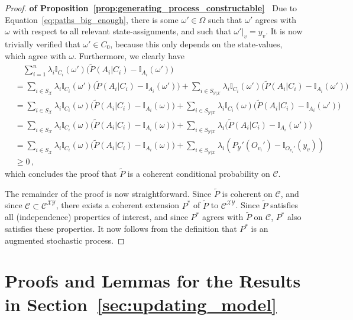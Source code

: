 \documentclass[twoside,11pt]{article}
\newcommand{\states}{\mathcal{X}}
\newcommand{\observs}{\mathcal{Y}}
\newcommand{\ind}[1]{\mathbb{I}_{#1}}
\begin{document}
\begin{proof}{\bf of Proposition~\ref{prop:generating_process_constructable}~}
Due to Equation~\eqref{eq:paths_big_enough}, there is some $\omega'\in\Omega$ such that $\omega'$ agrees with $\omega$ with respect to all relevant state-assignments, and such that $\omega'\vert_v=y_v$. It is now trivially verified that $\omega'\in C_0$, because this only depends on the state-values, which agree with $\omega$. Furthermore, we clearly have
\begin{align*}
 &\quad \sum_{i=1}^n\lambda_i\ind{C_i}(\omega')\bigl(\tilde{P}(A_i\vert C_i) - \ind{A_i}(\omega')\bigr) \\
 &= \sum_{i\in S_\states}\lambda_i\ind{C_i}(\omega')\bigl(\tilde{P}(A_i\vert C_i) - \ind{A_i}(\omega')\bigr) + \sum_{i\in S_{\observs\vert\states}}\lambda_i\ind{C_i}(\omega')\bigl(\tilde{P}(A_i\vert C_i) - \ind{A_i}(\omega')\bigr) \\
 &= \sum_{i\in S_\states}\lambda_i\ind{C_i}(\omega)\bigl(\tilde{P}(A_i\vert C_i) - \ind{A_i}(\omega)\bigr) + \sum_{i\in S_{\observs\vert\states}}\lambda_i\ind{C_i}(\omega)\bigl(\tilde{P}(A_i\vert C_i) - \ind{A_i}(\omega')\bigr) \\
 &= \sum_{i\in S_\states}\lambda_i\ind{C_i}(\omega)\bigl(\tilde{P}(A_i\vert C_i) - \ind{A_i}(\omega)\bigr) + \sum_{i\in S_{\observs\vert\states}}\lambda_i\bigl(\tilde{P}(A_i\vert C_i) - \ind{A_i}(\omega')\bigr) \\
 &= \sum_{i\in S_\states}\lambda_i\ind{C_i}(\omega)\bigl(\tilde{P}(A_i\vert C_i) - \ind{A_i}(\omega)\bigr) + \sum_{i\in S_{\observs\vert\states}}\lambda_i\left( P_\observs'(O_{v_i}') - \ind{O_{v_i}'}(y_v)\right) \\
 &\geq 0\,,
\end{align*}
which concludes the proof that $\tilde{P}$ is a coherent conditional probability on $\mathcal{C}$.

The remainder of the proof is now straightforward. Since $\tilde{P}$ is coherent on $\mathcal{C}$, and since $\mathcal{C}\subset\mathcal{C}^{\states\observs}$, there exists a coherent extension $P^*$ of $\tilde{P}$ to $\mathcal{C}^{\states\observs}$. Since $\tilde{P}$ satisfies all (independence) properties of interest, and since $P^*$ agrees with $\tilde{P}$ on $\mathcal{C}$, $P^*$ also satisfies these properties. It now follows from the definition that $P^*$ is an augmented stochastic process.
\end{proof}

\section{Proofs and Lemmas for the Results in Section~\ref{sec:updating_model}}
\end{document}
